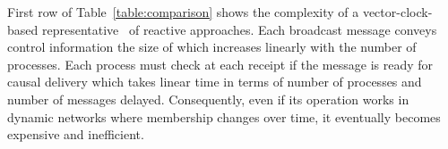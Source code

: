 
First row of Table~\ref{table:comparison} shows the complexity of a
vector-clock-based representative~\cite{schwarz1994detecting} of reactive
approaches. %
Each broadcast message conveys control information the size of which increases
linearly with the number of processes. Each process must check at each receipt
if the message is ready for causal delivery which takes linear time in terms of
number of processes and number of messages delayed. Consequently, even if its
operation works in dynamic networks where membership changes over time, it
eventually becomes expensive and inefficient.






%     



